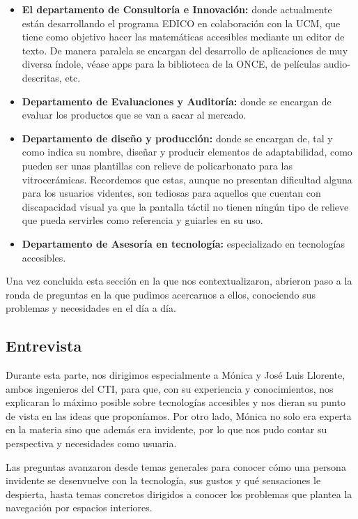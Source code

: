 \begin{itemize}
	\item \textbf{El departamento de Consultoría e Innovación:} donde actualmente están desarrollando el programa EDICO en colaboración con la UCM, que tiene como objetivo hacer las matemáticas accesibles mediante un editor de texto. De manera paralela se encargan del desarrollo de aplicaciones de muy diversa índole, véase apps para la biblioteca de la ONCE, de películas audio-descritas, etc.
	\item \textbf{Departamento de Evaluaciones y Auditoría:} donde se encargan de evaluar los productos que se van a sacar al mercado.
	\item \textbf{Departamento de diseño y producción:} donde se encargan de, tal y como indica su nombre, diseñar y producir elementos de adaptabilidad, como pueden ser unas plantillas con relieve de policarbonato para las vitrocerámicas. Recordemos que estas, aunque no presentan dificultad alguna para los usuarios videntes, son tediosas para aquellos que cuentan con discapacidad visual ya que la pantalla táctil no tienen ningún tipo de relieve que pueda servirles como referencia y guiarles en su uso.
	\item \textbf{Departamento de Asesoría en tecnología:} especializado en tecnologías accesibles.
\end{itemize}

Una vez concluida esta sección en la que nos contextualizaron, abrieron paso a la ronda de preguntas en la que pudimos acercarnos a ellos, conociendo sus problemas y necesidades en el día a día.

\subsection{Entrevista}

Durante esta parte, nos dirigimos especialmente a Mónica y José Luis Llorente, ambos ingenieros del CTI, para que, con su experiencia y conocimientos, nos explicaran lo máximo posible sobre tecnologías accesibles y nos dieran su punto de vista en las ideas que proponíamos. Por otro lado, Mónica no solo era experta en la materia sino que además era invidente, por lo que nos pudo contar su perspectiva y necesidades como usuaria.

Las preguntas avanzaron desde temas generales para conocer cómo una persona invidente se desenvuelve con la tecnología, sus gustos y qué sensaciones le despierta, hasta temas concretos dirigidos a conocer los problemas que plantea la navegación por espacios interiores.

